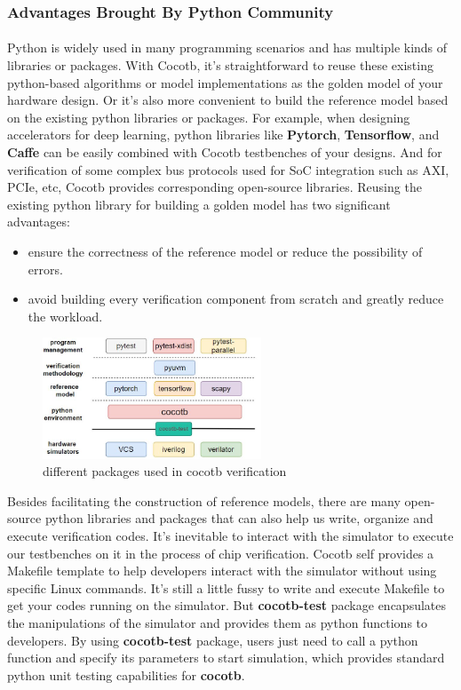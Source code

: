 \documentclass{article}
\begin{document}
\subsubsection{Advantages Brought By Python Community}
\paragraph{}
Python is widely used in many programming scenarios and has multiple kinds of libraries or packages. With Cocotb, it’s straightforward to reuse these existing python-based algorithms or model implementations as the golden model of your hardware design. Or it’s also more convenient to build the reference model based on the existing python libraries or packages. For example, when designing accelerators for deep learning, python libraries like \textbf{Pytorch}, \textbf{Tensorflow}, and \textbf{Caffe} can be easily combined with Cocotb testbenches of your designs. And for verification of some complex bus protocols used for SoC integration such as AXI, PCIe, etc, Cocotb provides corresponding open-source libraries. Reusing the existing python library for building a golden model has two significant advantages: 
\begin{itemize}
    \item  ensure the correctness of the reference model or reduce the possibility of errors.
    \item avoid building every verification component from scratch and greatly reduce the workload.
\end{itemize}

\begin{figure}[hbt]
\centering
\includegraphics[width=0.58\textwidth]{cocotb-package.jpg}
\caption{\label{fig:cocotb}different packages used in cocotb verification}
\end{figure}

Besides facilitating the construction of reference models, there are many open-source python libraries and packages that can also help us write, organize and execute verification codes. It’s inevitable to interact with the simulator to execute our testbenches on it in the process of chip verification. Cocotb self provides a Makefile template to help developers interact with the simulator without using specific Linux commands. It’s still a little fussy to write and execute Makefile to get your codes running on the simulator. But \textbf{cocotb-test} package encapsulates the manipulations of the simulator and provides them as python functions to developers. By using \textbf{cocotb-test} package, users just need to call a python function and specify its parameters to start simulation, which provides standard python unit testing capabilities for \textbf{cocotb}. 
\end{document}
